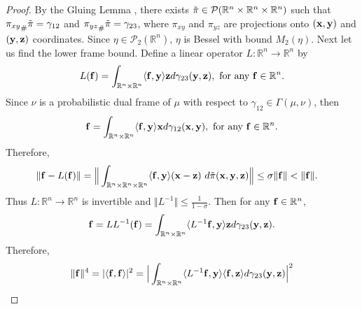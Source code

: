 \documentclass{amsart}
\numberwithin{equation}{section}
\theoremstyle{plain}
\theoremstyle{definition}
\begin{document}
\begin{proof}
By the Gluing Lemma \cite[pp.~59]{figalli2021invitation}, there exists $\Tilde{\pi} \in \mathcal{P}(\mathbb{R}^n \times \mathbb{R}^n \times \mathbb{R}^n)$ such that ${\pi_{xy}}_{\#}\Tilde{\pi} = \gamma_{12} $ and $  {\pi_{yz}}_{\#}\Tilde{\pi} = \gamma_{23}$, where $\pi_{xy}$ and $\pi_{yz}$ are projections onto $({\bf x},{\bf y})$ and $({\bf y},{\bf z})$ coordinates.
Since $\eta \in \mathcal{P}_2(\mathbb{R}^n)$, $\eta$ is Bessel with bound  $ M_2(\eta)$. Next let us find the lower frame bound. Define a linear operator $L: \mathbb{R}^n \rightarrow \mathbb{R}^n$ by 
     \begin{equation*}
         L({\bf f}) = \int_{\mathbb{R}^n \times \mathbb{R}^n} \langle {\bf f}, {\bf y} \rangle {\bf z} d \gamma_{23}({\bf y},{\bf z}), \ \text{for any} \ {\bf f} \in \mathbb{R}^n.
     \end{equation*}
Since $\nu$ is a probabilistic dual frame of $\mu$ with respect to $\gamma_{12} \in \Gamma(\mu, \nu)$, then 
     \begin{equation*}
    {\bf f} = \int_{\mathbb{R}^n \times \mathbb{R}^n} \langle {\bf f}, {\bf y} \rangle {\bf x}  d\gamma_{12}({\bf x}, {\bf y}) , \ \text{for any} \ {\bf f} \in \mathbb{R}^n.
\end{equation*}
Therefore, 
\begin{equation*}
\begin{split}
    \Vert {\bf f} -L({\bf f}) \Vert 
    &= \Big \Vert \int_{\mathbb{R}^n \times \mathbb{R}^n \times \mathbb{R}^n} \langle {\bf f} , {\bf y} \rangle ({\bf x}- {\bf z}) \ d \Tilde{\pi}({\bf x}, {\bf y},{\bf z}) \Big \Vert \leq  \sigma \Vert  {\bf f} \Vert  < \Vert {\bf f}   \Vert.
\end{split}
\end{equation*}
Thus $L: \mathbb{R}^n \rightarrow \mathbb{R}^n$ is invertible and $\Vert L^{-1} \Vert \leq \frac{1}{1-\sigma} $. Then for any ${\bf f} \in \mathbb{R}^n$, 
\begin{equation*}
    {\bf f} = LL^{-1}({\bf f}) = \int_{\mathbb{R}^n \times \mathbb{R}^n} \langle L^{-1}{\bf f}, {\bf y} \rangle {\bf z} d \gamma_{23}({\bf y},{\bf z}).
\end{equation*}
Therefore, 
\begin{equation*}
\begin{split}
   \Vert  {\bf f} \Vert^4 &=  |\langle {\bf f}, {\bf f} \rangle|^2 = \Big \vert \int_{\mathbb{R}^n \times \mathbb{R}^n} \langle L^{-1}{\bf f}, {\bf y} \rangle \langle {\bf f}, {\bf z} \rangle d \gamma_{23}({\bf y},{\bf z}) \Big \vert^2 \\

\end{split}
\end{equation*}
\end{proof}
\end{document}
